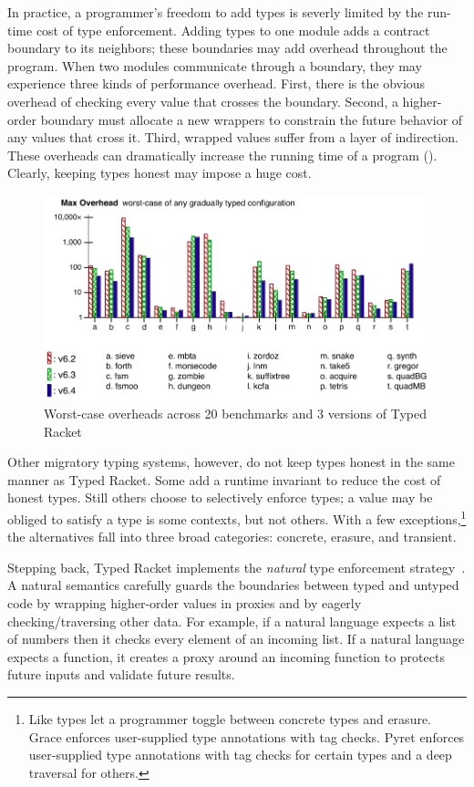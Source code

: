 In practice, a programmer's freedom to add types is severly limited by
 the run-time cost of type enforcement.
Adding types to one module adds a contract boundary to its neighbors;
 these boundaries may add overhead throughout the program.
When two modules communicate through a boundary, they may experience three kinds
 of performance overhead.
First, there is the obvious overhead of checking every value that crosses the
 boundary.
Second, a higher-order boundary must allocate a new wrappers to constrain the
 future behavior of any values that cross it.
Third, wrapped values suffer from a layer of indirection.
These overheads can dramatically increase the running time of a program
 ().
Clearly, keeping types honest may impose a huge cost.

\begin{figure}[h]
  \includegraphics[width=0.8\columnwidth]{src/jfp-2019-max.png}
  \caption{Worst-case overheads across 20 benchmarks and 3 versions of Typed Racket~\cite{gtnffvf-jfp-2019}}
  \label{fig:max-overhead}
\end{figure}

Other migratory typing systems, however, do not keep types honest in the
 same manner as Typed Racket.
Some add a runtime invariant to reduce the cost of honest types.
Still others choose to selectively enforce types; a value may be obliged to
 satisfy a type is some contexts, but not others.
With a few exceptions,\footnote{Like types
 let a programmer toggle between concrete types and erasure.
 Grace enforces user-supplied type annotations with tag checks.
 Pyret enforces user-supplied type annotations with tag checks
  for certain types and a deep traversal for others.}
 the alternatives fall into three broad categories:
 concrete, erasure, and transient.

Stepping back, Typed Racket implements the \emph{natural}\/ type enforcement
 strategy~\cite{todo}.
A natural semantics carefully guards the boundaries between typed and untyped
 code by wrapping higher-order values in proxies and by eagerly
 checking/traversing other data.
For example, if a natural language expects a list of numbers then it
 checks every element of an incoming list.
If a natural language expects a function, it creates a proxy around an incoming
 function to protects future inputs and validate future results.

